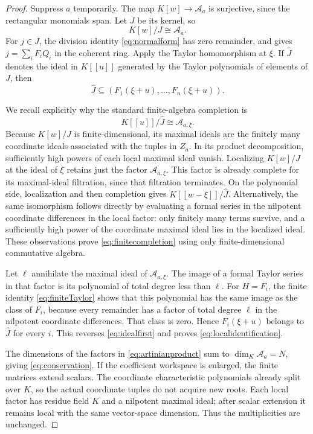 \documentclass[11pt,oneside]{article}
\numberwithin{equation}{section}
\theoremstyle{definition}
\theoremstyle{remark}\newtheorem{remark}[theorem]{Remark}
\begin{document}
\begin{proof}
Suppress \(a\) temporarily. The map \(K[w]\to\mathcal A_a\) is surjective, since the rectangular monomials span. Let \(J\) be its kernel, so
\[
 K[w]/J\cong\mathcal A_a.
\]
For \(j\in J\), the division identity \eqref{eq:normalform} has zero remainder, and gives \(j=\sum_iF_iQ_i\) in the coherent ring. Apply the Taylor homomorphism at \(\xi\). If \(\widehat J\) denotes the ideal in \(K[[u]]\) generated by the Taylor polynomials of elements of \(J\), then
\begin{equation}\label{eq:idealfirst}
 \widehat J\subseteq(F_1(\xi+u),\ldots,F_n(\xi+u)).
\end{equation}

We recall explicitly why the standard finite-algebra completion is
\begin{equation}\label{eq:finitecompletion}
 K[[u]]/\widehat J\cong\mathcal A_{a,\xi}.
\end{equation}
Because \(K[w]/J\) is finite-dimensional, its maximal ideals are the finitely many coordinate ideals associated with the tuples in \(Z_a\). In its product decomposition, sufficiently high powers of each local maximal ideal vanish. Localizing \(K[w]/J\) at the ideal of \(\xi\) retains just the factor \(\mathcal A_{a,\xi}\). This factor is already complete for its maximal-ideal filtration, since that filtration terminates. On the polynomial side, localization and then completion gives \(K[[w-\xi]]/\widehat J\). Alternatively, the same isomorphism follows directly by evaluating a formal series in the nilpotent coordinate differences in the local factor: only finitely many terms survive, and a sufficiently high power of the coordinate maximal ideal lies in the localized ideal. These observations prove \eqref{eq:finitecompletion} using only finite-dimensional commutative algebra.

Let \(\ell\) annihilate the maximal ideal of \(\mathcal A_{a,\xi}\). The image of a formal Taylor series in that factor is its polynomial of total degree less than \(\ell\). For \(H=F_i\), the finite identity \eqref{eq:finiteTaylor} shows that this polynomial has the same image as the class of \(F_i\), because every remainder has a factor of total degree \(\ell\) in the nilpotent coordinate differences. That class is zero. Hence \(F_i(\xi+u)\) belongs to \(\widehat J\) for every \(i\). This reverses \eqref{eq:idealfirst} and proves \eqref{eq:localidentification}.

The dimensions of the factors in \eqref{eq:artinianproduct} sum to \(\dim_K\mathcal A_a=N\), giving \eqref{eq:conservation}. If the coefficient workspace is enlarged, the finite matrices extend scalars. The coordinate characteristic polynomials already split over \(K\), so the actual coordinate tuples do not acquire new roots. Each local factor has residue field \(K\) and a nilpotent maximal ideal; after scalar extension it remains local with the same vector-space dimension. Thus the multiplicities are unchanged.


\end{proof}
\end{document}
